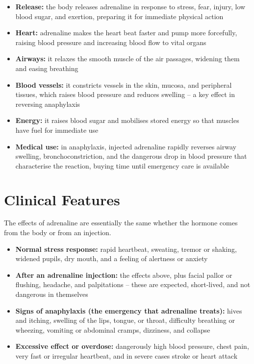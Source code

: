 \begin{itemize}
    \item \textbf{Release:} the body releases adrenaline in response to stress, fear, injury, low blood sugar, and exertion, preparing it for immediate physical action
    \item \textbf{Heart:} adrenaline makes the heart beat faster and pump more forcefully, raising blood pressure and increasing blood flow to vital organs
    \item \textbf{Airways:} it relaxes the smooth muscle of the air passages, widening them and easing breathing
    \item \textbf{Blood vessels:} it constricts vessels in the skin, mucosa, and peripheral tissues, which raises blood pressure and reduces swelling -- a key effect in reversing anaphylaxis
    \item \textbf{Energy:} it raises blood sugar and mobilises stored energy so that muscles have fuel for immediate use
    \item \textbf{Medical use:} in anaphylaxis, injected adrenaline rapidly reverses airway swelling, bronchoconstriction, and the dangerous drop in blood pressure that characterise the reaction, buying time until emergency care is available
\end{itemize}

\section*{Clinical Features}
The effects of adrenaline are essentially the same whether the hormone comes from the body or from an injection.

\begin{itemize}
    \item \textbf{Normal stress response:} rapid heartbeat, sweating, tremor or shaking, widened pupils, dry mouth, and a feeling of alertness or anxiety
    \item \textbf{After an adrenaline injection:} the effects above, plus facial pallor or flushing, headache, and palpitations -- these are expected, short-lived, and not dangerous in themselves
    \item \textbf{Signs of anaphylaxis (the emergency that adrenaline treats):} hives and itching, swelling of the lips, tongue, or throat, difficulty breathing or wheezing, vomiting or abdominal cramps, dizziness, and collapse
    \item \textbf{Excessive effect or overdose:} dangerously high blood pressure, chest pain, very fast or irregular heartbeat, and in severe cases stroke or heart attack
\end{itemize}

